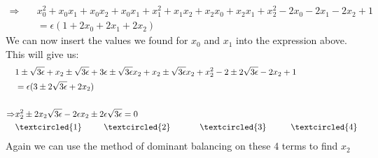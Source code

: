 \documentclass[english,a4paper,12pt]{article}
\begin{document}
\begin{align*}
\Rightarrow \quad &x_0^2 + x_0 x_1 + x_0 x_2 + x_0 x_1 + x_1^2 + x_1 x_2 + x_2 x_0 + x_2 x_1 + x_2^2 -2x_0 -2x_1 -2x_2 +1\\ 
&= \epsilon(1+2x_0 + 2x_1 +2x_2)
\end{align*}
We can now insert the values we found for $x_0$ and $x_1$ into the expression above. This will give us:\\
\begin{align*}
&1 \pm \sqrt{3 \epsilon} + x_2 \pm \sqrt{3 \epsilon} + 3 \epsilon \pm \sqrt{3 \epsilon}x_2 + x_2 \pm \sqrt{3 \epsilon}x_2 + x_2^2 -2 \pm 2 \sqrt{3 \epsilon} -2x_2 + 1\\ 
&= \epsilon(3 \pm 2\sqrt{3 \epsilon} + 2x_2)\\\\
\Rightarrow &x_2^2 \pm 2x_2 \sqrt{3 \epsilon} - 2\epsilon x_2 \pm 2 \epsilon \sqrt{3 \epsilon} = 0\\
&\textcircled{1} \hspace{9mm} \textcircled{2} \hspace{12mm} \textcircled{3} \hspace{10mm} \textcircled{4}
\end{align*}
Again we can use the method of dominant balancing on these 4 terms to find $x_2$\\
\end{document}
